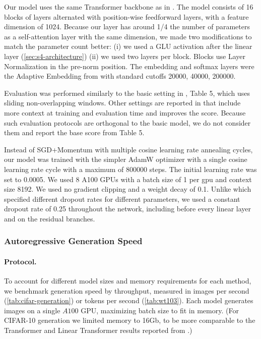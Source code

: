 Our \methodabbrv{} model uses the same Transformer backbone as in \citep{baevski2018adaptive}.
The model consists of 16 blocks of \methodabbrv{} layers alternated with position-wise feedforward layers, with a feature dimension of 1024.
Because our \methodabbrv{} layer has around 1/4 the number of parameters as a self-attention layer with the same dimension, we made two modifications to match the parameter count better:
(i) we used a GLU activation after the \methodabbrv{} linear layer (\cref{sec:s4-architecture})
(ii) we used two \methodabbrv{} layers per block.
Blocks use Layer Normalization in the pre-norm position.
The embedding and softmax layers were the Adaptive Embedding from \citep{baevski2018adaptive} with standard cutoffs 20000, 40000, 200000.

Evaluation was performed similarly to the basic setting in \citep{baevski2018adaptive}, Table 5,
which uses sliding non-overlapping windows.
Other settings are reported in \citep{baevski2018adaptive} that include more context at training and evaluation time and improves the score.
Because such evaluation protocols are orthogonal to the basic model, we do not consider them and report the base score from \citep{baevski2018adaptive} Table 5.

Instead of SGD+Momentum with multiple cosine learning rate annealing cycles,
our \methodabbrv{} model was trained with the simpler AdamW optimizer with a single cosine learning rate cycle with a maximum of 800000 steps.
The initial learning rate was set to 0.0005.
We used 8 A100 GPUs with a batch size of 1 per gpu and context size 8192.
We used no gradient clipping and a weight decay of 0.1.
Unlike \citep{baevski2018adaptive} which specified different dropout rates for different parameters,
we used a constant dropout rate of 0.25 throughout the network, including before every linear layer and on the residual branches.


\subsubsection{Autoregressive Generation Speed}
\label{sec:experiment-details-general-speed}

\paragraph{Protocol.}
To account for different model sizes and memory requirements for each method,
we benchmark generation speed by throughput,
measured in images per second (\cref{tab:cifar-generation}) or tokens per second (\cref{tab:wt103}).
Each model generates images on a single \( A100 \) GPU,
maximizing batch size to fit in memory.
(For CIFAR-10 generation we limited memory to 16Gb, to be more comparable to the Transformer and Linear Transformer results reported from \citep{katharopoulos2020transformers}.)

